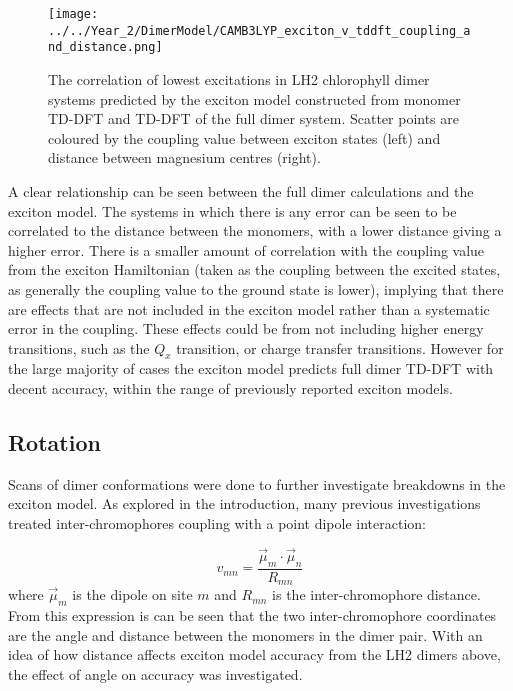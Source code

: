\begin{figure}
    \centering
    \texttt{[image: ../../Year\_2/DimerModel/CAMB3LYP\_exciton\_v\_tddft\_coupling\_and\_distance.png]}
    \label{fig:camb3lyp_excitons}
    \caption{The correlation of lowest excitations in LH2 chlorophyll dimer systems
    predicted by the exciton model constructed from monomer TD-DFT and TD-DFT of
    the full dimer system. Scatter points are coloured by the coupling value between
    exciton states (left) and distance between magnesium centres (right).}
\end{figure}

A clear relationship can be seen between the full dimer calculations and the exciton
model. The systems in which there is any error can be seen to be correlated to the
distance between the monomers, with a lower distance giving a higher error. There 
is a smaller amount of correlation with the coupling value from the exciton Hamiltonian
(taken as the coupling between the excited states, as generally the coupling value
to the ground state is lower), implying that there are effects that are not included
in the exciton model rather than a systematic error in the coupling. These effects
could be from not including higher energy transitions, such as the $Q_x$ transition,
or charge transfer transitions. However for the large majority of cases the exciton
model predicts full dimer TD-DFT with decent accuracy, within the range of previously
reported exciton models.

\subsection{Rotation}
\label{subsec:rotation}

Scans of dimer conformations were done to further investigate breakdowns in the
exciton model. As explored in the introduction, many previous investigations treated
inter-chromophores coupling with a point dipole interaction:

\begin{equation}
    v_{mn} = \frac{\vec{\mu}_m \cdot \vec{\mu}_n}{R_{mn}}
\end{equation}
%
where $\vec{\mu}_m$ is the dipole on site $m$ and $R_{mn}$ is the inter-chromophore
distance. From this expression is can be seen that the two inter-chromophore coordinates
are the angle and distance between the monomers in the dimer pair. With an idea
of how distance affects exciton model accuracy from the LH2 dimers above, the effect 
of angle on accuracy was investigated.

